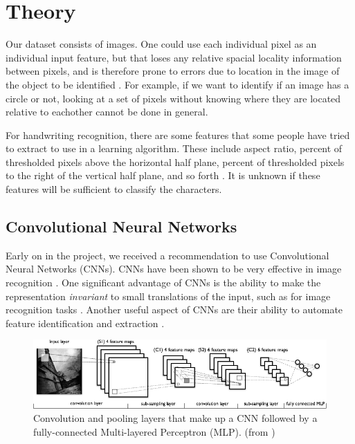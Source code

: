 \section{Theory}

Our dataset consists of images.  One could use each individual pixel as an individual input feature, but that loses any relative spacial locality information between pixels, and is therefore prone to errors due to location in the image of the object to be identified \cite{lecun1998gradient}.  For example, if we want to identify if an image has a circle or not, looking at a set of pixels without knowing where they are located relative to eachother cannot be done in general.

For handwriting recognition, there are some features that some people have tried to extract to use in a learning algorithm.  These include aspect ratio, percent of thresholded pixels above the horizontal half plane, percent of thresholded pixels to the right of the vertical half plane, and so forth \cite{wikihandwritfeat}.  It is unknown if these features will be sufficient to classify the characters.

\subsection{Convolutional Neural Networks}

Early on in the project, we received a recommendation to use Convolutional Neural Networks (CNNs).  CNNs have been shown to be very effective in image recognition \cite{korekado2003convolutional} \cite{ciresan2012multi}.  One significant advantage of CNNs is the ability to make the representation \emph{invariant} to small translations of the input, such as for image recognition tasks \cite{Bengio-et-al-2015-Book}.  Another useful aspect of CNNs are their ability to automate feature identification and extraction \cite{Bengio-et-al-2015-Book}.

\begin{figure}[ht]
  \centering
  \includegraphics[width=\textwidth]{images/mylenet.png}
  \caption{
    Convolution and pooling layers that make up a CNN followed by a
    fully-connected Multi-layered Perceptron (MLP).
    (from \cite{Bengio-et-al-2015-Book})
    }
  \label{fig:convnet}
\end{figure}

